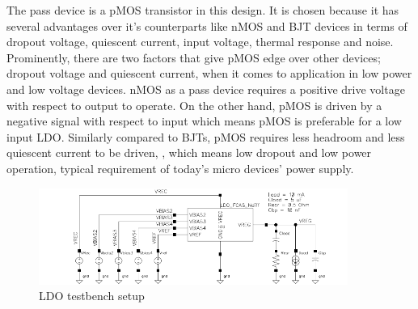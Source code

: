\documentclass[12pt,a4paper,UKenglish]{article}
\begin{document}
The pass device is a pMOS transistor in this design. It is chosen because it has several advantages over it's 
counterparts like nMOS and BJT devices in terms of dropout voltage, quiescent current, input voltage, thermal 
response and noise\cite{ldo_ti_pmos}. Prominently, there are two factors that give pMOS edge over other devices; 
dropout voltage and quiescent current, when it comes to application in low power and low voltage devices. nMOS as 
a pass device requires a positive drive voltage with respect to output to operate. On the other hand, pMOS is 
driven by a negative signal with respect to input which means pMOS is preferable for a low input LDO. Similarly 
compared to BJTs, pMOS requires less headroom and less quiescent current to be driven\cite{ldo_ti_pmos}, 
\cite{ldo_ti_stability}, which means low dropout and low power operation, typical requirement of today's micro 
devices' power supply. \\

\begin{figure}[htbp] %
   \centering
   \includegraphics[width=0.9\textwidth]{img/ldo_testbench.pdf} 
   \caption{LDO testbench setup}
   \label{fig:ldo_testbench}
\end{figure}
\end{document}
